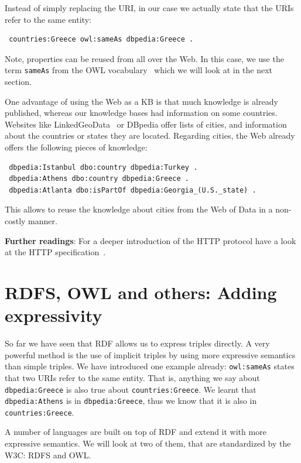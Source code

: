 Instead of simply replacing the URI, in our case we actually state that the URIs refer to the same entity:

\begin{verbatim}
 countries:Greece owl:sameAs dbpedia:Greece .
\end{verbatim}

Note, properties can be reused from all over the Web.
In this case, we use the term \texttt{sameAs} from the OWL vocabulary~\cite{owl} which we will look at in the next section.

One advantage of using the Web as a \ac{KB} is that much knowledge is already published,
whereas our knowledge bases had information on some countries.
Websites like LinkedGeoData~\cite{linkedgeodata} or DBpedia offer lists of cities, and information about the countries or states they are located.
Regarding cities, the Web already offers the following pieces of knowledge:

\begin{verbatim}
 dbpedia:Istanbul dbo:country dbpedia:Turkey .
 dbpedia:Athens dbo:country dbpedia:Greece .
 dbpedia:Atlanta dbo:isPartOf dbpedia:Georgia_(U.S._state) .
\end{verbatim}

This allows to reuse the knowledge about cities from the Web of Data in a non-costly manner.

\medskip

\textbf{Further readings}:
For a deeper introduction of the HTTP protocol have a look at the HTTP specification~\cite{http}.

\section{RDFS, OWL and others: Adding expressivity}
\label{rdfs}

So far we have seen that \ac{RDF} allows us to express triples directly.
A very powerful method is the use of implicit triples by using more expressive semantics than simple triples.
We have introduced one example already: \texttt{owl:sameAs} states that two URIs refer to the same entity.
That is, anything we say about \texttt{dbpedia:Greece} is also true about \texttt{countries:Greece}.
We learnt that \texttt{dbpedia:Athens} is in \texttt{dbpedia:Greece}, thus we know that it is also in \texttt{countries:Greece}.

A number of languages are built on top of \ac{RDF} and extend it with more expressive semantics.
We will look at two of them, that are standardized by the W3C: RDFS and OWL. %

